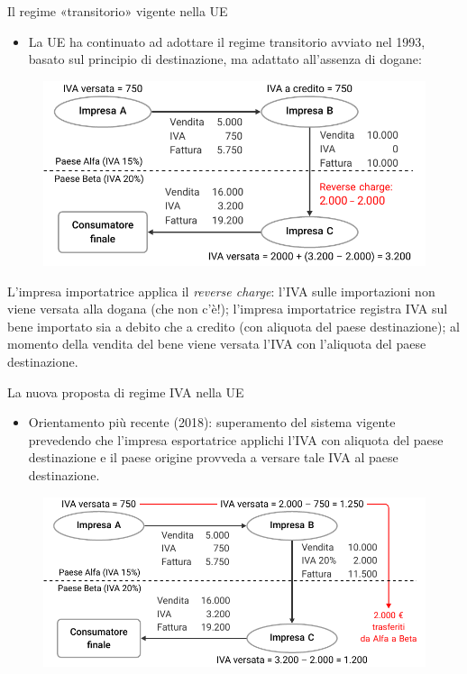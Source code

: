 \documentclass[aspectratio=149,11pt,italian]{beamer}
\begin{document}
\begin{frame}{Il regime «transitorio» vigente nella UE}
\begin{itemize}
\item La UE ha continuato ad adottare il \alert{regime transitorio} avviato nel 1993,
basato sul principio di \alert{destinazione}, ma adattato all'assenza di dogane:
\end{itemize}

\begin{figure}[htbp]
\centering
\includegraphics[width=.8\textwidth]{./figure/IVA-intracomunitaria.pdf}
\end{figure}

\footnotesize
L'impresa importatrice applica il \emph{reverse charge}: l'IVA sulle importazioni
non viene versata alla dogana (che non c'è!); l'impresa importatrice registra
IVA sul bene importato sia a debito che a credito (con aliquota del paese
destinazione); al momento della vendita del bene viene versata l'IVA con
l'aliquota del paese destinazione.
\end{frame}


\begin{frame}{La nuova proposta di regime IVA nella UE}
\begin{itemize}
\item Orientamento più recente (2018): superamento del sistema vigente prevedendo
che l'impresa esportatrice applichi l'IVA con aliquota del paese
destinazione e il paese origine provveda a versare tale IVA al paese
destinazione.
\end{itemize}


\begin{figure}[htbp]
\centering
\includegraphics[width=.9\textwidth]{./figure/IVA-proposta-2018.pdf}
\end{figure}
\end{frame}
\end{document}
